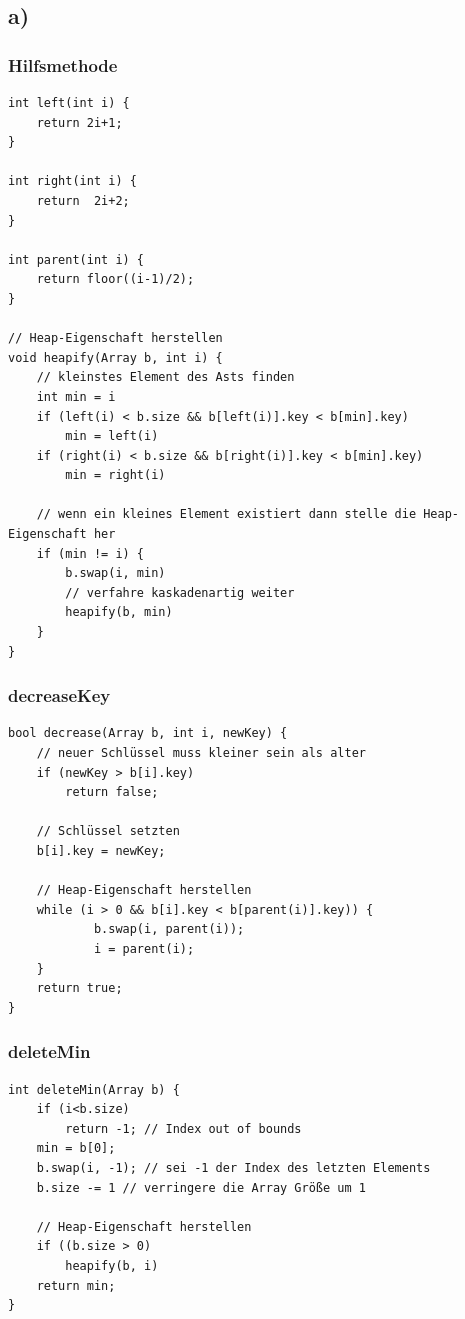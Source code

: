 \documentclass[a4paper,11pt,twoside]{scrartcl}
\begin{document}
\subsection*{a)}

\subsubsection*{Hilfsmethode}
\begin{lstlisting}[style=c,basicstyle=\small\ttfamily]
int left(int i) {
	return 2i+1;
}

int right(int i) {
	return  2i+2;
}

int parent(int i) {
	return floor((i-1)/2);
}

// Heap-Eigenschaft herstellen
void heapify(Array b, int i) {
	// kleinstes Element des Asts finden 
	int min = i
	if (left(i) < b.size && b[left(i)].key < b[min].key)
		min = left(i)
	if (right(i) < b.size && b[right(i)].key < b[min].key)
		min = right(i)
		
	// wenn ein kleines Element existiert dann stelle die Heap-Eigenschaft her
	if (min != i) {
		b.swap(i, min)
		// verfahre kaskadenartig weiter
		heapify(b, min)
	}
}

\end{lstlisting}

\subsubsection*{decreaseKey}
\begin{lstlisting}[style=c,basicstyle=\small\ttfamily]
bool decrease(Array b, int i, newKey) {
	// neuer Schlüssel muss kleiner sein als alter
	if (newKey > b[i].key)
		return false;
	
	// Schlüssel setzten
 	b[i].key = newKey;
	
	// Heap-Eigenschaft herstellen
	while (i > 0 && b[i].key < b[parent(i)].key)) {
    		b.swap(i, parent(i));
    		i = parent(i);
	}
	return true;
}
\end{lstlisting}


\pagebreak


\subsubsection*{deleteMin}
\begin{lstlisting}[style=c,basicstyle=\small\ttfamily]
int deleteMin(Array b) {
	if (i<b.size)
		return -1; // Index out of bounds
	min = b[0];
	b.swap(i, -1); // sei -1 der Index des letzten Elements
	b.size -= 1 // verringere die Array Größe um 1

	// Heap-Eigenschaft herstellen
	if ((b.size > 0)
		heapify(b, i)
	return min;	
}
\end{lstlisting}
\end{document}
